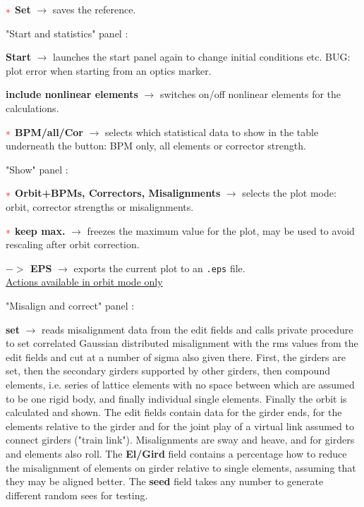 \documentclass[12pt]{article}
\newcommand{\redast}{{\color{red}\ast}}
\newcommand\code[1]{{\tt #1}}
\newcommand{\ofld}[1]{\colorbox{black!15}{{\bf #1}}}
\newcommand\guico[1]{{\color{blue}\code{#1}}}
\newcommand{\evcod}[2]{\ofld{#1} $\rightarrow$ \guico{#2}}
\newcommand{\opagui}[1]{\colorbox{blue!20}{{\color{black}\code{#1}}}}
\newcommand{\ogui}[1]{\hyperref[#1]{\opagui{#1}}}
\newcommand{\todo}[1]{{\color{red} #1}}
\begin{document}
$\redast$ \evcod{Set}{butBPMrefClick} saves the reference.

"Start and statistics" panel \guico{panctr}:

\evcod{Start}{butStaClick} launches the \ogui{ostartmenu} start panel again to change initial conditions etc. \todo{BUG: plot error when starting from an optics marker.}

\evcod{include nonlinear elements}{chkSextClick} switches on/off nonlinear elements for the calculations.

$\redast$ \evcod{BPM/all/Cor}{butCODstatClick} selects which statistical data to show in the table underneath the button: BPM only, all elements or corrector strength.

"Show" panel \guico{panplo}:

$\redast$ \evcod{Orbit+BPMs, Correctors, Misalignments}{butplotOCClick} selects the plot mode: orbit, corrector strengths or misalignments.

$\redast$ \evcod{keep max.}{chkKeepMaxClick} freezes the maximum value for the plot, may be used to avoid rescaling after orbit correction.

\evcod{$-\!\!>$ EPS}{butEPSClick} exports the current plot to an \code{.eps} file.\\[1ex]


\underline{Actions available in orbit mode only}

"Misalign and correct" panel \guico{panmis}:

\evcod{set}{butMisalClick} reads misalignment data from the edit fields and calls private procedure \guico{SetMisalignments} to set correlated Gaussian distributed misalignment with the rms values from the edit fields and cut at a number of sigma also given there. First, the girders are set, then the secondary girders supported by other girders, then compound elements, i.e. series of lattice elements with no space between which are assumed to be one rigid body, and finally individual single elements. Finally the orbit is calculated and shown. The edit fields contain data for the girder ends, for the elements relative to the girder and for the joint play of a virtual link assumed to connect girders ("train link"). Misalignments are sway and heave, and for girders and elements also roll. The \ofld{El/Gird} field contains a percentage how to reduce the misalignment of elements on girder relative to single elements, assuming that they may be aligned better. The \ofld{seed} field takes any number to generate different random sees for testing.
\end{document}

